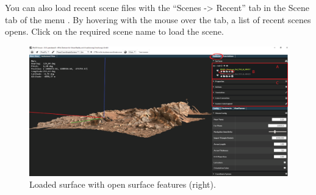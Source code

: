 You can also load recent scene files with the ``Scenes -> Recent'' tab in the Scene tab of the menu . By hovering with the mouse over the tab,
a list of recent scenes opens. Click on the required scene name to load the scene.

\begin{figure}[h]
    	\centering
    		\includegraphics[width=1\textwidth]{pics/NewSurfaceAI.png}
    	\caption[New Surface]{Loaded surface with open surface features (right).}
    	\label{fig:NewSurface}
   \end{figure} 
	